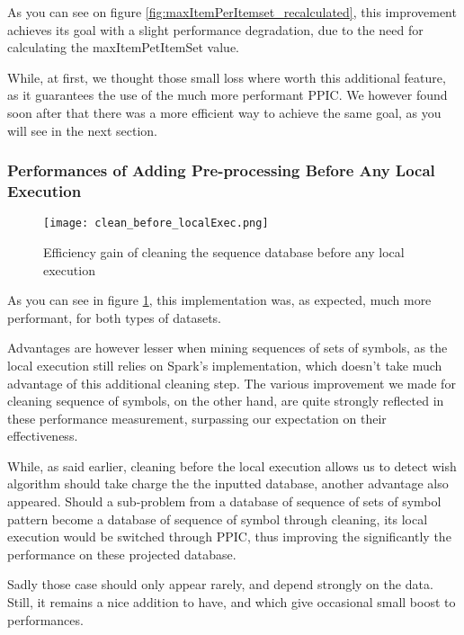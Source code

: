 \documentclass{eplmastersthesis}
\begin{document}
As you can see on figure \ref{fig:maxItemPerItemset_recalculated}, this improvement achieves its goal with a slight performance degradation, due to the need for calculating the maxItemPetItemSet value. \newline

While, at first, we thought those small loss where worth this additional feature, as it guarantees the use of the much more performant PPIC. We however found soon after that there was a more efficient way to achieve the same goal, as you will see in the next section.

\subsubsection{Performances of Adding Pre-processing Before Any Local Execution}

\begin{figure}[h]
  \centering
  \texttt{[image: clean\_before\_localExec.png]}
  \caption{Efficiency gain of cleaning the sequence database before any local execution}
  \label{fig:cleaning_before_local_exec}
\end{figure}

As you can see in figure \ref{fig:cleaning_before_local_exec}, this implementation was, as expected, much more performant, for both types of datasets. \newline

Advantages are however lesser when mining sequences of sets of symbols, as the local execution still relies on Spark's implementation, which doesn't take much advantage of this additional cleaning step. The various improvement we made for cleaning sequence of symbols, on the other hand, are quite strongly reflected in these performance measurement, surpassing our expectation on their effectiveness.

While, as said earlier, cleaning before the local execution allows us to detect wish algorithm should take charge the the inputted database, another advantage also appeared. Should a sub-problem from a database of sequence of sets of symbol pattern become a database of sequence of symbol through cleaning, its local execution would be switched through PPIC, thus improving the significantly the performance on these projected database. \newline

Sadly those case should only appear rarely, and depend strongly on the data. Still, it remains a nice addition to have, and which give occasional small boost to performances.
\end{document}
